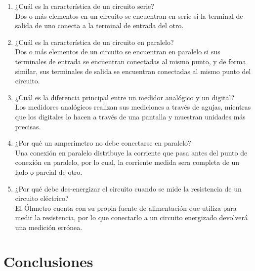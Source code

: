 \documentclass[a4paper,12pt]{article}
\begin{document}
\begin{enumerate}
\item ¿Cuál es la característica de un circuito serie?\\
	Dos o más elementos en un circuito se encuentran en serie si la terminal de salida de uno conecta a la terminal de entrada del otro.\par
\item ¿Cuál es la característica de un circuito en paralelo?\\
	Dos o más elementos de un circuito se encuentran en paralelo si sus terminales de entrada se encuentran conectadas al mismo punto, y de forma similar, sus terminales de salida se encuentran conectadas al mismo punto del circuito.\par
\item ¿Cuál es la diferencia principal entre un medidor analógico y un digital?\\
	Los medidores analógicos realizan sus mediciones a través de agujas, mientras que los digitales lo hacen a través de una pantalla y muestran unidades más precisas.\par
\item ¿Por qué un amperímetro no debe conectarse en paralelo?\\
	Una conexión en paralelo distribuye la corriente que pasa antes del punto de conexión en paralelo, por lo cual, la corriente medida sera completa de un lado o parcial de otro.\par
\item ¿Por qué debe des-energizar el circuito cuando se mide la resistencia de un circuito eléctrico?\\
	El Óhmetro cuenta con su propia fuente de alimentación que utiliza para medir la resistencia, por lo que conectarlo a un circuito energizado devolverá una medición errónea.\par
\end{enumerate}

\newpage

\section{Conclusiones}

\vspace{.5cm}
\end{document}
